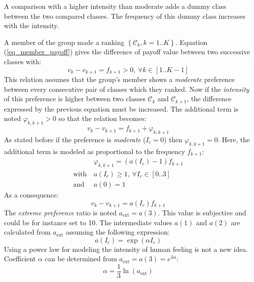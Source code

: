 \documentclass[12pt,a4paper]{article}
\begin{document}
A comparison with a higher intensity than moderate adds a dummy class between the two compared classes. The frequency of this dummy class increases with the intensity.

A member of the group made a ranking $\left\lbrace\mathcal{C}_k, k=1..K\right\rbrace$. Equation (\ref{eq_member_payoff}) gives the difference of payoff value between two successive classes with:
\begin{equation}
v_k-v_{k+1} = f_{k+1}>0,\ \forall k\in[1..K-1]
\end{equation}
This relation assumes that the group's member shows a \textsl{moderate} preference between every consecutive pair of classes which they ranked. Now if the \textsl{intensity} of this preference is higher between two classes $\mathcal{C}_k$ and $\mathcal{C}_{k+1}$, the difference expressed by the previous equation must be increased. The additional term is noted $\varphi_{k,k+1}>0$ so that the relation becomes:
\begin{equation}
v_k-v_{k+1} = f_{k+1} + \varphi_{k,k+1}
\end{equation}
As stated before if the preference is \textsl{moderate} ($I_c=0$) then $\varphi_{k,k+1}=0$. Here, the additional term is modeled as proportional to the frequency $f_{k+1}$:
\begin{equation}\label{eq_add_term}
\begin{split}
&\varphi_{k,k+1} = \left(a\left(I_c\right)-1\right)f_{k+1} \\
\mathrm{with}\ &a\left(I_c\right) \geq 1,\ \forall I_c\in[0..3] \\
\mathrm{and}\ &a(0)=1
\end{split}
\end{equation}
As a consequence:
\begin{equation}
v_k-v_{k+1} = a\left(I_c\right) f_{k+1}
\end{equation}
The \textsl{extreme preference} ratio is noted $a_\mathrm{ext} = a(3)$. This value is subjective and could be for instance set to 10. The intermediate values $a(1)$ and $a(2)$ are calculated from $a_\mathrm{ext}$ assuming the following expression:
\begin{equation}\label{eq_intensity_ratio}
a\left(I_c\right) = \exp(\alpha I_c)
\end{equation}
Using a power law for modeling the intensity of human feeling is not a new idea. Coefficient $\alpha$ can be determined from $a_\mathrm{ext} = a(3) = e^{3\alpha}$:
\begin{equation}\label{eq_intensity_exponent}
\alpha = \frac13\ln(a_\mathrm{ext})
\end{equation}
\end{document}
